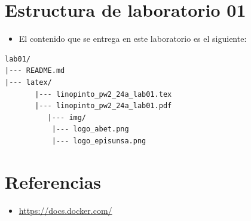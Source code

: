 \documentclass{article}
\newcommand{\itemPracticeNumber}{01}
\begin{document}
%


\section{Estructura de laboratorio \itemPracticeNumber}
\begin{itemize}
	\item El contenido que se entrega en este laboratorio es el siguiente:
\end{itemize}
\begin{lstlisting}[style=ascii-tree]
lab01/
|--- README.md
|--- latex/
	   |--- linopinto_pw2_24a_lab01.tex
	   |--- linopinto_pw2_24a_lab01.pdf
          |--- img/
	       |--- logo_abet.png
	       |--- logo_episunsa.png
\end{lstlisting}

\section{Referencias}
\begin{itemize}
	\item \url{https://docs.docker.com/}
\end{itemize}

%
%
%
\end{document}
